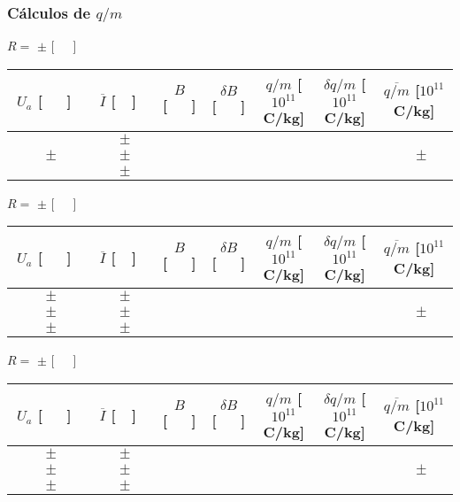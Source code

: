 \documentclass[a4paper,12pt]{article}  %
\begin{document}
\subsubsection{\sf Cálculos de $q/m$}
\label{sec:calc}
\begin{center}
	\noindent	$R =$ \underline{\makebox[1.5cm][r]{~}}  $\pm$  	\underline{\makebox[1cm][r]{~}}  [~~~]
	\begin{tabular}{|c|c|c|c|c|c|c|}
	\hline %
	  $U_a$ [~~~] & $\overline{I}$ [~~] &  $B$ [~~~] & $\delta B$  [~~~] & $q/m$ [$10^{11}$C/kg] & $\delta q/m$ [$10^{11}$C/kg] & $\overline{q/m}$ [$10^{11}$C/kg]\\ \hline %
	 &$\qquad \pm \quad$&&&&& \\ \cline{2-6}
	$\qquad \pm \quad$ &$\qquad \pm \quad$&&&&& $\qquad \pm \quad$   \\ \cline{2-6}
	 &$\qquad \pm \quad$&&&&& \\ \hline 
 	\end{tabular}

	\noindent	$R =$ \underline{\makebox[1.5cm][r]{~}}  $\pm$  	\underline{\makebox[1cm][r]{~}}  [~~~]
	\begin{tabular}{|c|c|c|c|c|c|c|}  
	\hline %
	  $U_a$ [~~~] & $\overline{I}$ [~~] &  $B$ [~~~] & $\delta B$  [~~~] & $q/m$ [$10^{11}$C/kg] & $\delta q/m$ [$10^{11}$C/kg] & $\overline{q/m}$ [$10^{11}$C/kg]\\ \hline 
	 $\qquad \pm \quad$ &$\qquad \pm \quad$&&&&& \\ \cline{2-6}
	 $\qquad \pm \quad$ &$\qquad \pm \quad$&&&&& $\qquad \pm \quad$ \\ \cline{2-6}
	 $\qquad \pm \quad$ &$\qquad \pm \quad$&&&&& \\
	 \hline 
	\end{tabular}

	\noindent	$R =$ \underline{\makebox[1.5cm][r]{~}}  $\pm$  	\underline{\makebox[1cm][r]{~}}  [~~~]
	\begin{tabular}{|c|c|c|c|c|c|c|}  
	\hline %
	  $U_a$ [~~~] & $\overline{I}$ [~~] &  $B$ [~~~] & $\delta B$  [~~~] & $q/m$ [$10^{11}$C/kg] & $\delta q/m$ [$10^{11}$C/kg] & $\overline{q/m}$ [$10^{11}$C/kg]\\ \hline 
	 $\qquad \pm \quad$ &$\qquad \pm \quad$&&&&& \\ \cline{2-6}
	 $\qquad \pm \quad$ &$\qquad \pm \quad$&&&&& $\qquad \pm \quad$ \\ \cline{2-6}
	 $\qquad \pm \quad$ &$\qquad \pm \quad$&&&&& \\
	 \hline 
	\end{tabular}


\end{center}
\end{document}
